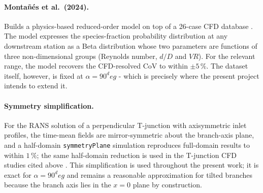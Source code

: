 \documentclass[11pt,a4paper]{article}
\def\dD{d/D}%
\def\VR{VR}%
\def\CoV{CoV}%
\def\circ{ deg}%
\newcommand{\dD}{\ensuremath{d/D}}
\newcommand{\VR}{\ensuremath{\mathrm{VR}}}
\newcommand{\CoV}{\ensuremath{\mathrm{CoV}}}
\begin{document}
\paragraph{Monta\~n\'es et al.\ (2024).}
Builds a physics-based reduced-order model on top of a 26-case CFD
database \citep{montanes2024comprehensive}. The model expresses the
species-fraction probability distribution at any downstream station
as a Beta distribution whose two parameters are functions of three
non-dimensional groups (Reynolds number, \(\dD\) and \(\VR\)). For
the relevant range, the model recovers the CFD-resolved \CoV{} to
within \(\pm 5\,\%\). The dataset itself, however, is fixed at
\(\alpha=90^\circ\) - which is precisely where the present project
intends to extend it.

\paragraph{Symmetry simplification.}
For the RANS solution of a perpendicular T-junction with
axisymmetric inlet profiles, the time-mean fields are mirror-symmetric
about the branch-axis plane, and a half-domain
\texttt{symmetryPlane} simulation reproduces full-domain results to
within \(1\,\%\); the same half-domain reduction is used in the
T-junction CFD studies cited above
\citep{su2022prediction,montanes2024comprehensive,du2024numerical}.
This simplification is used throughout the present work; it is exact for
\(\alpha=90^\circ\) and remains a reasonable approximation for
tilted branches because the branch axis lies in the \(x=0\) plane
by construction.
\end{document}
